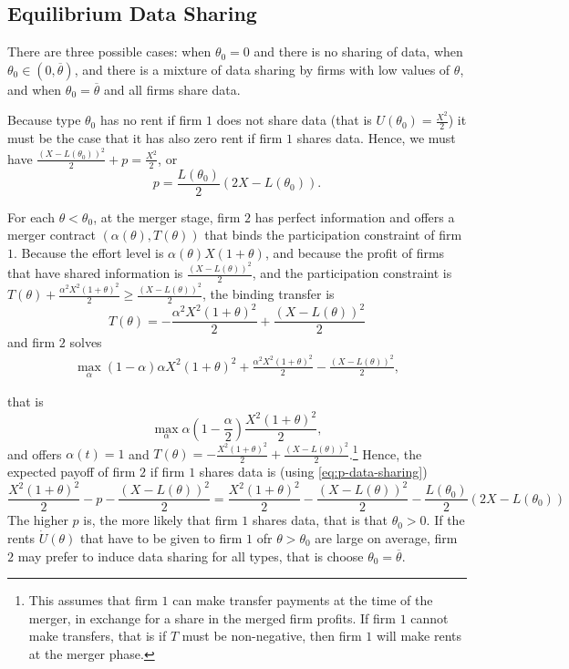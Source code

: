 \documentclass[a4paper]{article}
\renewcommand{\t}{\theta}
\renewcommand{\a}{\alpha}
\begin{document}


\subsection*{Equilibrium Data Sharing}
There are three possible cases: when $\t_0=0$ and there is no sharing of data, when $\t_0\in(0,\overline \t)$, and there is a mixture of data sharing by firms with low values of $\t$, and when $\t_0=\overline \t$ and all firms share data.

Because type $\t_0$ has no rent if firm $1$ does not share data (that is $U(\t_0)=\frac{X^2}{2}$) it must be the case that it has also zero rent if firm $1$ shares data. Hence, we must have $\frac{(X-L(\t_0))^2}{2}+p=\frac{X^2}{2}$, or
%
\begin{equation}\label{eq:p-data-sharing}
    p=\frac{L(\t_0)}{2}(2X-L(\t_0)).   
\end{equation}

%
For each $\t<\t_0$, at the merger stage, firm $2$ has perfect information and offers a merger contract $(\a(\t),T(\t))$ that binds the participation constraint of firm $1$. Because the effort level is $\a(\t)X(1+\t)$, and because the profit of firms that have shared information is $\frac{(X-L(\t))^2}{2}$, and the participation constraint is $T(\t)+ \frac{\a^2X^2(1+\t)^2}{2}\geq \frac{(X-L(\t))^2}{2}$, the binding transfer is $$T(\t)= -\frac{\a^2X^2(1+\t)^2}{2}+\frac{(X-L(\t))^2}{2}$$
%
and firm $2$ solves
%
\begin{align*}
\max_{\a} (1-\a)\a X^2(1+\t)^2+\frac{\a^2X^2(1+\t)^2}{2}-\frac{(X-L(\t))^2}{2},
\end{align*}

that is 
%
\[
\max_{\a} \a(1-\frac{\a}{2})\frac{X^2(1+\t)^2}{2},
\]
%
and offers $\a(t)=1$ and $T(\t)= -\frac{X^2(1+\t)^2}{2}+\frac{(X-L(\t))^2}{2}$.\footnote{%
This assumes that firm $1$ can make transfer payments at the time of the merger, in exchange for a share in the merged firm profits. If firm $1$ cannot make transfers, that is if $T$ must be non-negative, then firm $1$ will make rents at the merger phase.
}
Hence, the expected payoff of firm $2$ if firm $1$ shares data is (using \eqref{eq:p-data-sharing})
%
\[
  \frac{X^2(1+\t)^2}{2}-p-\frac{(X-L(\t))^2}{2}=\frac{X^2(1+\t)^2}{2}-\frac{(X-L(\t))^2}{2}-\frac{L(\t_0)}{2}(2X-L(\t_0))
\]
%
The  higher $p$ is, the more likely that firm $1$ shares data, that is that $\t_0>0$. If the rents $\dot U(\t)$ that have to be given to firm $1$ ofr $\t>\t_0$ are large on average, firm $2$ may prefer to induce data sharing for all types, that is choose $\t_0=\overline \t$.
\end{document}
